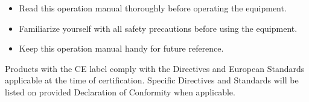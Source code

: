 \begin{tcolorbox}
\begin{itemize}
 \renewcommand{\labelitemi}{\scriptsize$\blacksquare$}
\item Read this operation manual thoroughly before operating the equipment.
\item Familiarize yourself with all safety precautions before using the equipment.
\item Keep this operation manual handy for future reference.  
\end{itemize}
\end{tcolorbox}

\vspace{0.125in}


\noindent Products with the CE label comply with the Directives and European Standards 
applicable at the time of certification. Specific Directives and Standards will be 
listed on provided Declaration of Conformity when applicable.

